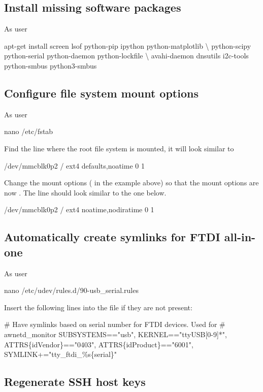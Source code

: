 \subsection{Install missing software packages}
As user \rootUser
\begin{Cmd}
apt-get install screen lsof python-pip ipython python-matplotlib \textbackslash
    python-scipy python-serial python-daemon python-lockfile \textbackslash
    avahi-daemon dnsutils i2c-tools python-smbus python3-smbus
\end{Cmd}

\subsection{Configure file system mount options}

As user \rootUser
\begin{Cmd}
nano /etc/fstab  
\end{Cmd}

Find the line where the root file system is mounted, it will look
similar to
\begin{Cmd}
/dev/mmcblk0p2  /               ext4    defaults,noatime  0       1
\end{Cmd}
Change the mount options ( in the example
above) so that the mount options are now
. The line should look similar to the one
below.
\begin{Cmd}
/dev/mmcblk0p2  /               ext4    noatime,nodiratime  0       1
\end{Cmd}

\subsection{Automatically create symlinks for FTDI all-in-one}

As user \rootUser
\begin{Cmd}
nano /etc/udev/rules.d/90-usb_serial.rules
\end{Cmd}

Insert the following lines into the file if they are not present:
\begin{Cmd}[fontsize=\relsize{-3}]
# Have symlinks based on serial number for FTDI devices. Used for 
# awnetd_monitor
SUBSYSTEMS=="usb", KERNEL=="ttyUSB[0-9]*", ATTRS\{idVendor\}=="0403", ATTRS\{idProduct\}=="6001", SYMLINK+="tty_ftdi_\%s\{serial\}"  
\end{Cmd}

\subsection{Regenerate SSH host keys}

